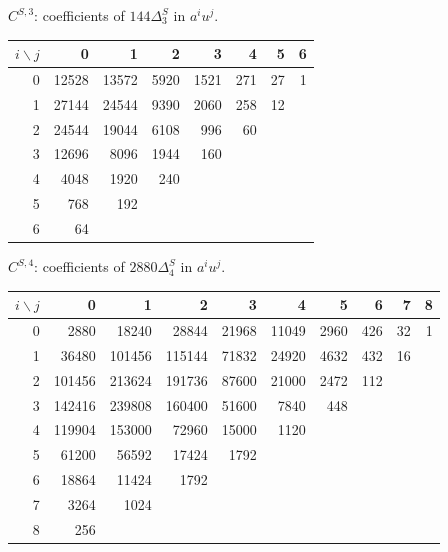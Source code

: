 \documentclass[11pt,a4paper]{article}
\begin{document}
\begin{center}
\begin{minipage}{1\textwidth}
\centering\small
$C^{S,3}$: coefficients of $144\Delta^{S}_{3}$ in $a^i u^j$.\par\smallskip
\begin{tabular}{r|rrrrrrr}
$i\backslash j$ & 0 & 1 & 2 & 3 & 4 & 5 & 6 \\
\hline
0 & 12528 & 13572 & 5920 & 1521 & 271 & 27 & 1 \\
1 & 27144 & 24544 & 9390 & 2060 & 258 & 12 &  \\
2 & 24544 & 19044 & 6108 & 996 & 60 &  &  \\
3 & 12696 & 8096 & 1944 & 160 &  &  &  \\
4 & 4048 & 1920 & 240 &  &  &  &  \\
5 & 768 & 192 &  &  &  &  &  \\
6 & 64 &  &  &  &  &  &  \\
\end{tabular}
\end{minipage}
\end{center}
\begin{center}
\begin{minipage}{1\textwidth}
\centering\small
$C^{S,4}$: coefficients of $2880\Delta^{S}_{4}$ in $a^i u^j$.\par\smallskip
\begin{tabular}{r|rrrrrrrrr}
$i\backslash j$ & 0 & 1 & 2 & 3 & 4 & 5 & 6 & 7 & 8 \\
\hline
0 & 2880 & 18240 & 28844 & 21968 & 11049 & 2960 & 426 & 32 & 1 \\
1 & 36480 & 101456 & 115144 & 71832 & 24920 & 4632 & 432 & 16 &  \\
2 & 101456 & 213624 & 191736 & 87600 & 21000 & 2472 & 112 &  &  \\
3 & 142416 & 239808 & 160400 & 51600 & 7840 & 448 &  &  &  \\
4 & 119904 & 153000 & 72960 & 15000 & 1120 &  &  &  &  \\
5 & 61200 & 56592 & 17424 & 1792 &  &  &  &  &  \\
6 & 18864 & 11424 & 1792 &  &  &  &  &  &  \\
7 & 3264 & 1024 &  &  &  &  &  &  &  \\
8 & 256 &  &  &  &  &  &  &  &  \\
\end{tabular}
\end{minipage}
\end{center}

\clearpage


\end{document}

